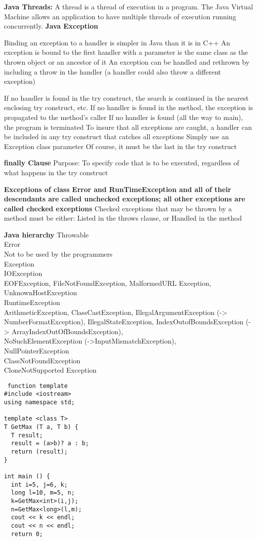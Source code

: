 \documentclass{article}
\begin{document}
\textbf{Java Threads:} A thread is a thread of execution in a program. The Java Virtual Machine allows an application to have multiple threads of execution running concurrently.
\textbf{Java Exception}

Binding an exception to a handler is simpler in Java than it is in C++
An exception is bound to the first handler with a parameter is the same class as the thrown object or an ancestor of it
An exception can be handled and rethrown by including a throw in the handler (a handler could also throw a different exception)

If no handler is found in the try construct, the search is continued in the nearest enclosing try construct, etc.
If no handler is found in the method, the exception is propagated to the method’s caller
If no handler is found (all the way to main), the program is terminated
To insure that all exceptions are caught, a handler can be included in any try construct that catches all exceptions
Simply use an Exception class parameter
Of course, it must be the last in the try construct


\textbf{finally Clause}
Purpose: To specify code that is to be executed, regardless of what happens in the try construct

\textbf{Exceptions of class Error and RunTimeException and all of their descendants are called unchecked exceptions; all other exceptions are called checked exceptions}
Checked exceptions that may be thrown by a method must be either:
Listed in the throws clause, or
Handled in the method

\textbf{Java hierarchy}
Throwable\\
Error\\
Not to be used by the programmers\\
Exception\\
IOException\\
EOFException, FileNotFoundException, MalformedURL Exception, UnknownHostException\\
RuntimeException\\
ArithmeticException, ClassCastException, IllegalArgumentException (-> NumberFormatException), IllegalStateException,  IndexOutofBoundsException (-> ArrayIndexOutOfBoundsException),   \\
    NoSuchElementException (->InputMismatchException),\\
    NullPointerException\\
ClassNotFoundException\\
CloneNotSupported Exception\\



\begin{lstlisting}
 function template
#include <iostream>
using namespace std;

template <class T>
T GetMax (T a, T b) {
  T result;
  result = (a>b)? a : b;
  return (result);
}

int main () {
  int i=5, j=6, k;
  long l=10, m=5, n;
  k=GetMax<int>(i,j);
  n=GetMax<long>(l,m);
  cout << k << endl;
  cout << n << endl;
  return 0;
\end{lstlisting}
\end{document}
